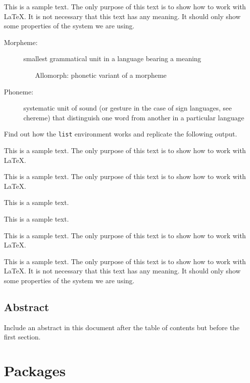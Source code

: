 \documentclass[10pt, paper=a4, abstracton]{scrartcl}
\begin{document}
This is a sample text. The only purpose of this text is to show how to work with \LaTeX . It is not necessary that this text has any meaning. It should only show some properties of the system we are using.

\begin{description}
	\item[Morpheme:] smallest grammatical unit in a language bearing a meaning
	
	\begin{itemize}
		\item[Allomorph:] phonetic variant of a morpheme 
	\end{itemize}
	
	\item[Phoneme:] systematic unit of sound (or gesture in the case of sign 
	languages, see chereme) that distinguish one word from another in a particular 
	language
\end{description}

Find out how the \texttt{list} environment works and replicate the following output.

\begin{list}{--}{\footnotesize }
	\item This is a sample text. The only purpose of this text is to show how to work with \LaTeX .
	\item This is a sample text. The only purpose of this text is to show how to work with \LaTeX .
	\begin{list}{-}{}
		\item This is a sample text. 
		\item This is a sample text. 
	\end{list}
	\item This is a sample text. The only purpose of this text is to show how to work with \LaTeX .
\end{list}

This is a sample text. The only purpose of this text is to show how to work with \LaTeX . It is not necessary that this text has any meaning. It should only show some properties of the system we are using.


\subsection{Abstract}

Include an abstract in this document after the table of contents but before the first section.


\section{Packages}
\end{document}
